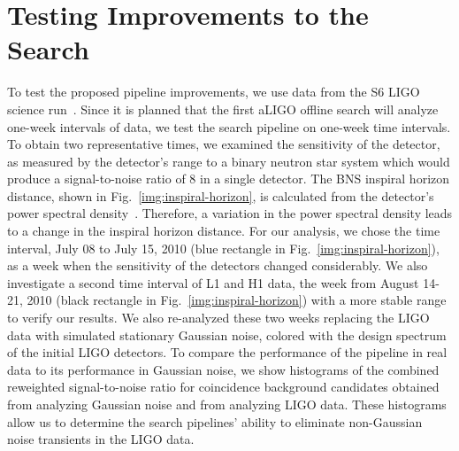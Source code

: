 \documentclass[12pt]{iopart} \usepackage{graphicx,amssymb}
\begin{document}
\section{Testing Improvements to the Search}
\label{s:methods}

To test the proposed pipeline improvements, we use data from the S6 LIGO science
run~\cite{Abadie:2011nz}.  Since it is planned that the first aLIGO offline
search will analyze one-week intervals of data, we test the
search pipeline on one-week time intervals. To obtain two representative
times, we examined the sensitivity of the detector, as measured by the
detector's range to a binary neutron star system which would produce a
signal-to-noise ratio of 8 in a single detector.  The BNS inspiral horizon 
distance, shown in Fig.~\ref{img:inspiral-horizon}, is calculated from the
detector's power spectral density~\cite{Abadie:2011nz}.  Therefore, a 
variation in the power spectral density leads to a change in the inspiral 
horizon distance.  For our analysis, we chose the time interval, July 08 to 
July 15, 2010 (blue rectangle in Fig.~\ref{img:inspiral-horizon}), as a week 
when the sensitivity of the detectors changed considerably.  We also 
investigate a second time interval of L1 and H1 data, the week from August 
14-21, 2010 (black rectangle in Fig.~\ref{img:inspiral-horizon}) with a more
stable range to verify our results.
We also re-analyzed these two weeks replacing the LIGO data with simulated
stationary Gaussian noise, colored with the design spectrum of the initial LIGO detectors.
To compare the performance of the pipeline in real data to its performance in
Gaussian noise, we show histograms of the combined reweighted signal-to-noise ratio for coincidence
background candidates  obtained from analyzing Gaussian noise and from
analyzing LIGO data. These histograms allow us to determine the search
pipelines' ability to eliminate non-Gaussian noise transients in the LIGO
data.
\end{document}
